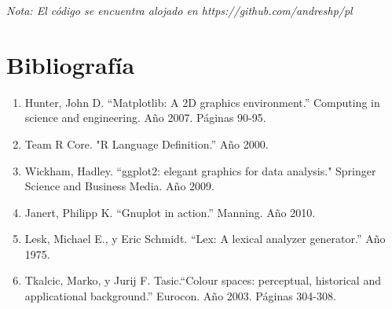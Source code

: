 \documentclass{article}
\begin{document}
		\textit{Nota: El código se encuentra alojado en https://github.com/andreshp/pl}
	

\section{Bibliografía}

	\begin{enumerate}
		\item Hunter, John D. ``Matplotlib: A 2D graphics environment.'' Computing in science and engineering. Año 2007. Páginas 90-95.
		\item Team R Core. "R Language Definition.'' Año 2000.
		\item Wickham, Hadley. ``ggplot2: elegant graphics for data analysis." Springer Science and Business Media. Año 2009.
		\item Janert, Philipp K. ``Gnuplot in action.'' Manning. Año 2010.
		\item Lesk, Michael E., y Eric Schmidt. ``Lex: A lexical analyzer generator.'' Año 1975.
		\item Tkalcic, Marko, y Jurij F. Tasic.``Colour spaces: perceptual, historical and applicational background.'' Eurocon. Año 2003. Páginas 304-308.
	\end{enumerate}
\end{document}

